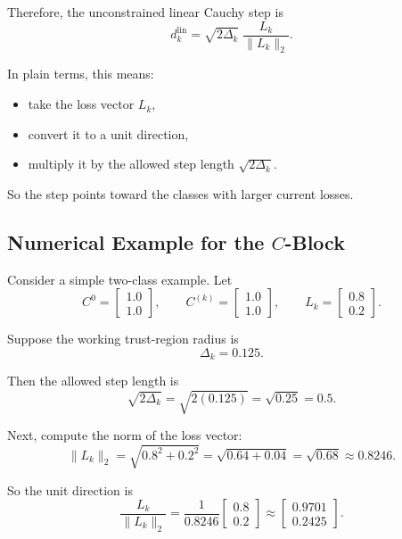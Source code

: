 \documentclass{article}
\begin{document}
Therefore, the unconstrained linear Cauchy step is
\begin{equation}
 d_k^{\mathrm{lin}} = \sqrt{2\Delta_k}\;\frac{L_k}{\|L_k\|_2}.
\end{equation}

In plain terms, this means:
\begin{itemize}
    \item take the loss vector $L_k$,
    \item convert it to a unit direction,
    \item multiply it by the allowed step length $\sqrt{2\Delta_k}$.
\end{itemize}

So the step points toward the classes with larger current losses.

\subsection{Numerical Example for the $C$-Block}

Consider a simple two-class example. Let
\begin{equation}
 C^0 = \begin{bmatrix}1.0 \\ 1.0\end{bmatrix},
 \qquad
 C^{(k)} = \begin{bmatrix}1.0 \\ 1.0\end{bmatrix},
 \qquad
 L_k = \begin{bmatrix}0.8 \\ 0.2\end{bmatrix}.
\end{equation}

Suppose the working trust-region radius is
\begin{equation}
 \Delta_k = 0.125.
\end{equation}

Then the allowed step length is
\begin{equation}
 \sqrt{2\Delta_k} = \sqrt{2(0.125)} = \sqrt{0.25} = 0.5.
\end{equation}

Next, compute the norm of the loss vector:
\begin{equation}
 \|L_k\|_2 = \sqrt{0.8^2 + 0.2^2} = \sqrt{0.64 + 0.04} = \sqrt{0.68} \approx 0.8246.
\end{equation}

So the unit direction is
\begin{equation}
 \frac{L_k}{\|L_k\|_2}
 = \frac{1}{0.8246}
 \begin{bmatrix}0.8 \\ 0.2\end{bmatrix}
 \approx
 \begin{bmatrix}0.9701 \\ 0.2425\end{bmatrix}.
\end{equation}
\end{document}
